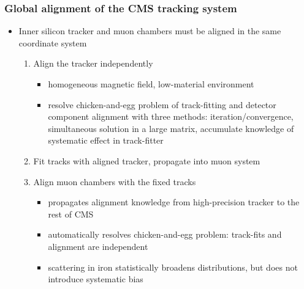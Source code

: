\documentclass[compress]{beamer}
\begin{document}
\begin{frame}
\frametitle{Global alignment of the CMS tracking system}

\begin{itemize}
\item Inner silicon tracker and muon chambers must be aligned in the same coordinate system
\begin{enumerate}\setlength{\itemsep}{0.2 cm}
\item Align the tracker independently

\vspace{0.05 cm}
\begin{itemize}\setlength{\itemsep}{0.1 cm}
\item homogeneous magnetic field, low-material environment
\item resolve chicken-and-egg problem of track-fitting and detector
  component alignment with three methods: iteration/convergence,
  simultaneous solution in a large matrix, accumulate knowledge of
  systematic effect in track-fitter
\end{itemize}

\item Fit tracks with aligned tracker, propagate into muon system

\item Align muon chambers with the fixed tracks

\vspace{0.1 cm}
\begin{itemize}\setlength{\itemsep}{0.1 cm}
\item propagates alignment knowledge from high-precision tracker to the rest of CMS
\item automatically resolves chicken-and-egg problem: track-fits and alignment are independent
\item scattering in iron statistically broadens distributions, but does not introduce systematic bias
\end{itemize}
\end{enumerate}
\end{itemize}
\end{frame}
\end{document}
